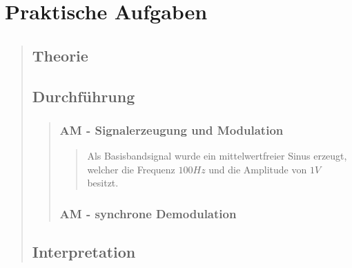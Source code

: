 \section{Praktische Aufgaben}
\begin{quote}
   
   \subsection{Theorie}
   \begin{quote}
   
   \end{quote}
   
   \subsection{Durchführung}
   \begin{quote}
   	
   		\subsubsection{AM - Signalerzeugung und Modulation}
   		\begin{quote}
   			Als Basisbandsignal wurde ein mittelwertfreier Sinus erzeugt, welcher die
   			Frequenz $100 Hz$ und die Amplitude von $1 V$ besitzt. 
   		\end{quote}
   		
   		\subsubsection{AM - synchrone Demodulation}
   		\begin{quote}
   		
   		\end{quote}
   \end{quote}
   
   \subsection{Interpretation}
   \begin{quote}
   
   \end{quote}
   
\end{quote}	




